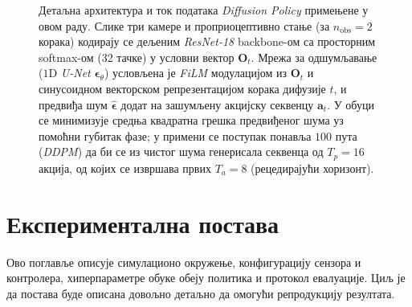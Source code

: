 \documentclass[12pt, a4paper]{article}
\begin{document}
\begin{figure}[htbp]
{%
    }
    \caption[Детаљна архитектура \textit{Diffusion Policy}]{Детаљна архитектура и ток података \textit{Diffusion Policy} примењене у овом раду. Слике три камере и проприоцептивно стање (за $n_{\mathrm{obs}}=2$ корака) кодирају се дељеним \textit{ResNet-18} backbone-ом са просторним softmax-ом (32 тачке) у условни вектор $\mathbf{O}_t$. Мрежа за одшумљавање ($1$D \textit{U-Net} $\boldsymbol{\epsilon}_\theta$) условљена је \textit{FiLM} модулацијом из $\mathbf{O}_t$ и синусоидном векторском репрезентацијом корака дифузије $t$, и предвиђа шум $\hat{\boldsymbol{\epsilon}}$ додат на зашумљену акцијску секвенцу $\mathbf{a}_t$. У обуци се минимизује средња квадратна грешка предвиђеног шума уз помоћни губитак фазе; у примени се поступак понавља $100$ пута (\textit{DDPM}) да би се из чистог шума генерисала секвенца од $T_p=16$ акција, од којих се извршава првих $T_a=8$ (рецедирајући хоризонт).}
    \label{fig:dp_arh}
\end{figure}

\section{Експериментална постава}
\label{sec:eksperimentalna_postava}

Ово поглавље описује симулационо окружење, конфигурацију сензора и контролера, хиперпараметре обуке обеју политика и протокол евалуације.
Циљ је да постава буде описана довољно детаљно да омогући репродукцију резултата.
\end{document}
